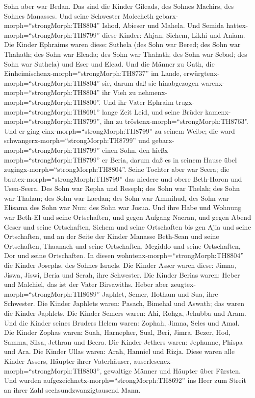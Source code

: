 Sohn aber war Bedan. Das sind die Kinder Gileads, des Sohnes Machirs,
des Sohnes Manasses.  Und seine Schwester Molecheth
gebarx-morph=``strongMorph:TH8804'' Ishod, Abieser und Mahela.
 Und Semida hattex-morph=``strongMorph:TH8799'' diese
Kinder: Ahjan, Sichem, Likhi und Aniam.  Die Kinder
Ephraims waren diese: Suthela (des Sohn war Bered; des Sohn war Thahath;
des Sohn war Eleada; des Sohn war Thahath;  des Sohn war
Sebad; des Sohn war Suthela) und Eser und Elead. Und die Männer zu Gath,
die Einheimischenx-morph=``strongMorph:TH8737'' im Lande,
erwürgtenx-morph=``strongMorph:TH8804'' sie, darum daß sie hinabgezogen
warenx-morph=``strongMorph:TH8804'' ihr Vieh zu
nehmenx-morph=``strongMorph:TH8800''.  Und ihr Vater
Ephraim trugx-morph=``strongMorph:TH8691'' lange Zeit Leid, und seine
Brüder kamenx-morph=``strongMorph:TH8799'', ihn zu
tröstenx-morph=``strongMorph:TH8763''.  Und er ging
einx-morph=``strongMorph:TH8799'' zu seinem Weibe; die ward
schwangerx-morph=``strongMorph:TH8799'' und
gebarx-morph=``strongMorph:TH8799'' einen Sohn, den
hießx-morph=``strongMorph:TH8799'' er Beria, darum daß es in seinem
Hause übel zugingx-morph=``strongMorph:TH8804''.  Seine
Tochter aber war Seera; die bautex-morph=``strongMorph:TH8799'' das
niedere und obere Beth-Horon und Usen-Seera.  Des Sohn war
Repha und Reseph; des Sohn war Thelah; des Sohn war Thahan;
 des Sohn war Laedan; des Sohn war Ammihud, des Sohn war
Elisama  des Sohn war Nun; des Sohn war Josua.
 Und ihre Habe und Wohnung war Beth-El und seine
Ortschaften, und gegen Aufgang Naeran, und gegen Abend Geser und seine
Ortschaften, Sichem und seine Ortschaften bis gen Ajia und seine
Ortschaften,  und an der Seite der Kinder Manasse Beth-Sean
und seine Ortschaften, Thaanach und seine Ortschaften, Megiddo und seine
Ortschaften, Dor und seine Ortschaften. In diesen
wohntenx-morph=``strongMorph:TH8804'' die Kinder Josephs, des Sohnes
Israels.  Die Kinder Asser waren diese: Jimna, Jiswa,
Jiswi, Beria und Serah, ihre Schwester.  Die Kinder Berias
waren: Heber und Malchiel, das ist der Vater Birsawiths. 
Heber aber zeugtex-morph=``strongMorph:TH8689'' Japhlet, Semer, Hotham
und Sua, ihre Schwester.  Die Kinder Japhlets waren:
Pasach, Bimehal und Aswath; das waren die Kinder Japhlets. 
Die Kinder Semers waren: Ahi, Rohga, Jehubba und Aram.  Und
die Kinder seines Bruders Helem waren: Zophah, Jimna, Seles und Amal.
 Die Kinder Zophas waren: Suah, Harnepher, Sual, Beri,
Jimra,  Bezer, Hod, Samma, Silsa, Jethran und Beera.
 Die Kinder Jethers waren: Jephunne, Phispa und Ara.
 Die Kinder Ullas waren: Arah, Hanniel und Rizja.
 Diese waren alle Kinder Assers, Häupter ihrer Vaterhäuser,
auserlesenex-morph=``strongMorph:TH8803'', gewaltige Männer und Häupter
über Fürsten. Und wurden aufgezeichnetx-morph=``strongMorph:TH8692'' ins
Heer zum Streit an ihrer Zahl sechsundzwanzigtausend Mann.

